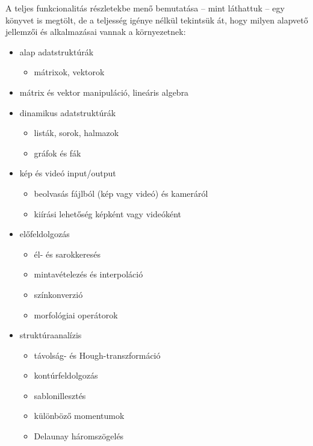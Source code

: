 A teljes funkcionalitás részletekbe menő bemutatása -- mint láthattuk \cite{opencv_book} -- egy könyvet is megtölt, de a teljesség igénye nélkül tekintsük át, hogy milyen alapvető jellemzői és alkalmazásai vannak a környezetnek:

\begin{itemize}

 \item alap adatstruktúrák
  \begin{itemize}
   \item mátrixok, vektorok
  \end{itemize} 

 \item mátrix és vektor manipuláció, lineáris algebra
  
 \item dinamikus adatstruktúrák
  \begin{itemize}
   \item listák, sorok, halmazok
   \item gráfok és fák
  \end{itemize}

 \item kép és videó input/output
  \begin{itemize}
   \item beolvasás fájlból (kép vagy videó) és kameráról
   \item kiírási lehetőség képként vagy videóként
  \end{itemize}

 \item előfeldolgozás
  \begin{itemize}
   \item él- és sarokkeresés
   \item mintavételezés és interpoláció
   \item színkonverzió
   \item morfológiai operátorok
  \end{itemize}

 \item struktúraanalízis
  \begin{itemize}
   \item távolság- és Hough-transzformáció
   \item kontúrfeldolgozás
   \item sablonillesztés
   \item különböző momentumok
   \item Delaunay háromszögelés
  \end{itemize}


\end{itemize}
